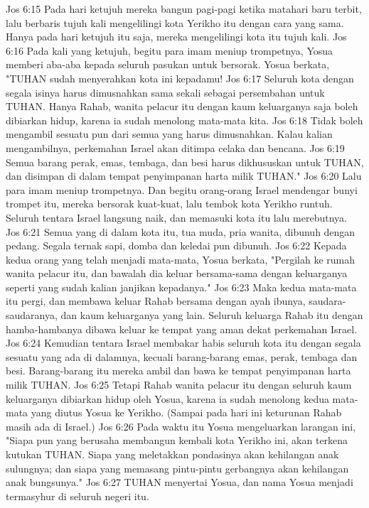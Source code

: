 Jos 6:15  Pada hari ketujuh mereka bangun pagi-pagi ketika matahari baru terbit, lalu berbaris tujuh kali mengelilingi kota Yerikho itu dengan cara yang sama. Hanya pada hari ketujuh itu saja, mereka mengelilingi kota itu tujuh kali.
Jos 6:16  Pada kali yang ketujuh, begitu para imam meniup trompetnya, Yosua memberi aba-aba kepada seluruh pasukan untuk bersorak. Yosua berkata, "TUHAN sudah menyerahkan kota ini kepadamu!
Jos 6:17  Seluruh kota dengan segala isinya harus dimusnahkan sama sekali sebagai persembahan untuk TUHAN. Hanya Rahab, wanita pelacur itu dengan kaum keluarganya saja boleh dibiarkan hidup, karena ia sudah menolong mata-mata kita.
Jos 6:18  Tidak boleh mengambil sesuatu pun dari semua yang harus dimusnahkan. Kalau kalian mengambilnya, perkemahan Israel akan ditimpa celaka dan bencana.
Jos 6:19  Semua barang perak, emas, tembaga, dan besi harus dikhususkan untuk TUHAN, dan disimpan di dalam tempat penyimpanan harta milik TUHAN."
Jos 6:20  Lalu para imam meniup trompetnya. Dan begitu orang-orang Israel mendengar bunyi trompet itu, mereka bersorak kuat-kuat, lalu tembok kota Yerikho runtuh. Seluruh tentara Israel langsung naik, dan memasuki kota itu lalu merebutnya.
Jos 6:21  Semua yang di dalam kota itu, tua muda, pria wanita, dibunuh dengan pedang. Segala ternak sapi, domba dan keledai pun dibunuh.
Jos 6:22  Kepada kedua orang yang telah menjadi mata-mata, Yosua berkata, "Pergilah ke rumah wanita pelacur itu, dan bawalah dia keluar bersama-sama dengan keluarganya seperti yang sudah kalian janjikan kepadanya."
Jos 6:23  Maka kedua mata-mata itu pergi, dan membawa keluar Rahab bersama dengan ayah ibunya, saudara-saudaranya, dan kaum keluarganya yang lain. Seluruh keluarga Rahab itu dengan hamba-hambanya dibawa keluar ke tempat yang aman dekat perkemahan Israel.
Jos 6:24  Kemudian tentara Israel membakar habis seluruh kota itu dengan segala sesuatu yang ada di dalamnya, kecuali barang-barang emas, perak, tembaga dan besi. Barang-barang itu mereka ambil dan bawa ke tempat penyimpanan harta milik TUHAN.
Jos 6:25  Tetapi Rahab wanita pelacur itu dengan seluruh kaum keluarganya dibiarkan hidup oleh Yosua, karena ia sudah menolong kedua mata-mata yang diutus Yosua ke Yerikho. (Sampai pada hari ini keturunan Rahab masih ada di Israel.)
Jos 6:26  Pada waktu itu Yosua mengeluarkan larangan ini, "Siapa pun yang berusaha membangun kembali kota Yerikho ini, akan terkena kutukan TUHAN. Siapa yang meletakkan pondasinya akan kehilangan anak sulungnya; dan siapa yang memasang pintu-pintu gerbangnya akan kehilangan anak bungsunya."
Jos 6:27  TUHAN menyertai Yosua, dan nama Yosua menjadi termasyhur di seluruh negeri itu.
